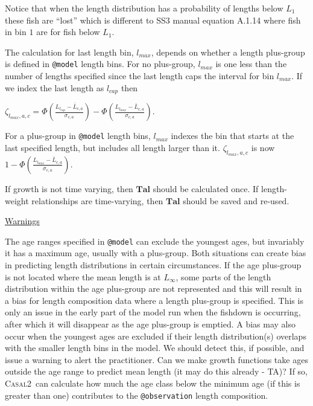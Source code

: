 \documentclass[a4paper,11pt,twoside,pdftex,draft]{article}
\newcommand{\CNAME}{\textsc{Casal2}}
\begin{document}
Notice that when the length distribution has a probability of lengths below $L_{1}$ these fish are ``lost''
which is different to SS3 manual equation A.1.14 where fish in bin $1$ are for fish below $L_{1}$.

The calculation for last length bin, $l_{max}$, depends on whether a length plus-group is defined in \texttt{@model} length bins. For no plus-group, $l_{max}$ is one less than the number of lengths specified since the last length caps the interval for bin $l_{max}$. If we index the last length as $l_{cap}$
then 

$\zeta_{l_{max},a,c} = \Phi\left( \frac{L_{l_{cap}} - \bar L_{c,a}   }{\sigma_{c,a}} \right)   - \Phi\left( \frac{L_{l_{max}} - \bar L_{c,a}   }{\sigma_{c,a}} \right)  $. 

For a plus-group in \texttt{@model} length bins, $l_{max}$ indexes the bin that starts at  the last specified length, but includes all length larger than it. $\zeta_{l_{max},a,c}$ is now  $ 1 - \Phi\left( \frac{L_{l_{max}} - \bar L_{c,a}   }{\sigma_{c,a}} \right)$.

If growth is not time varying, then $\mathbf{Tal}$ should be calculated once. If length-weight relationships are time-varying, then $\mathbf{Tal}$ should be saved and re-used.

\bigskip
\underline{Warnings}

The age ranges specified in \texttt{@model} can exclude the youngest ages, but invariably it has a maximum age, usually with a plus-group. Both situations can create bias in predicting length distributions in certain circumstances.  If the age plus-group is not located where the mean length is at $L_{\infty}$, some parts of the length distribution within the age plus-group are not represented and this will result in a bias for length composition data where a length plus-group is specified. This is only an issue in the early part of the model run when the fishdown is occurring, after which it will disappear as the age plus-group is emptied.  A bias may also occur when the youngest ages are excluded if their length distribution(s) overlaps with the smaller length bins in the model. We should detect this, if possible, and issue a warning to alert the practitioner. 
Can we make growth functions take ages outside the age range to predict mean length (it may do this already - TA)? If so, \CNAME\  can calculate how much the age class below the minimum age (if this is greater than one) contributes to the \texttt{@observation} length composition. 
\end{document}
